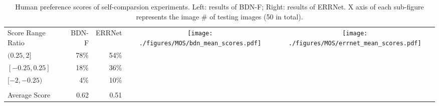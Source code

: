 \documentclass[10pt,twocolumn,letterpaper]{article}
\begin{document}
\begin{table*}[!htbp]
\centering
    \begin{tabular}{ l r r c c}
      \toprule
      Score Range Ratio & BDN-F & ERRNet &
      \multirow{5}{*}{\texttt{[image: ./figures/MOS/bdn\_mean\_scores.pdf]}} &  
     \multirow{5}{*}{\texttt{[image: ./figures/MOS/errnet\_mean\_scores.pdf]}} \\
$(0.25, 2]$  &  78\%  &  54\%  \\ \cline{1-3}
     $[-0.25, 0.25]$ & 18\% & 36\% \\ \cline{1-3}
    $[-2, -0.25)$ & 4\% & 10\% \\ \cline{1-3}
     
     \\
      Average Score &  0.62 & 0.51 \\ 
      \bottomrule
    \end{tabular}
    \caption{Human preference scores of self-comparsion experiments. Left:
      results of BDN-F; Right: results of ERRNet. X axis of each sub-figure  represents the image \# of testing images (50 in total).} \label{fig:MOS}
\end{table*}
\end{document}
